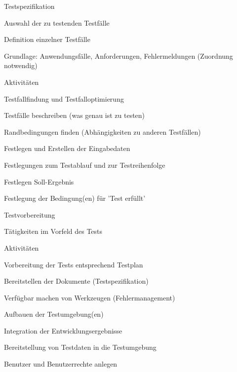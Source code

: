 \documentclass[a4paper]{article}
\begin{document}
\begin{multicols}{3}
  Testspezifikation
  \begin{itemize*}
    \item Auswahl der zu testenden Testfälle
    \item Definition einzelner Testfälle
    \begin{itemize*}
      \item Grundlage: Anwendungsfälle, Anforderungen, Fehlermeldungen (Zuordnung notwendig)
    \end{itemize*}
    \item Aktivitäten
    \begin{itemize*}
      \item Testfallfindung und Testfalloptimierung
      \item Testfälle beschreiben (was genau ist zu testen)
      \item Randbedingungen finden (Abhängigkeiten zu anderen Testfällen)
      \item Festlegen und Erstellen der Eingabedaten
      \item Festlegungen zum Testablauf und zur Testreihenfolge
      \item Festlegen Soll-Ergebnis
      \item Festlegung der Bedingung(en) für 'Test erfüllt'
    \end{itemize*}
  \end{itemize*}

  Testvorbereitung
  \begin{itemize*}
    \item Tätigkeiten im Vorfeld des Tests
    \item Aktivitäten
    \begin{itemize*}
      \item Vorbereitung der Tests entsprechend Testplan
      \item Bereitstellen der Dokumente (Testspezifikation)
      \item Verfügbar machen von Werkzeugen (Fehlermanagement)
      \item Aufbauen der Testumgebung(en)
      \item Integration der Entwicklungsergebnisse
      \item Bereitstellung von Testdaten in die Testumgebung
      \item Benutzer und Benutzerrechte anlegen
    \end{itemize*}
  \end{itemize*}


\end{multicols}
\end{document}
